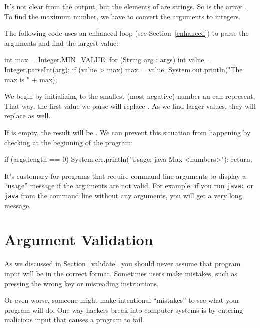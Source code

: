 \begin{stdout}
[10, -3, 55, 0, 14]
\end{stdout}

It's not clear from the output, but the elements of  are strings.
So  is the array .
To find the maximum number, we have to convert the arguments to integers.

The following code uses an enhanced  loop (see Section~\ref{enhanced}) to parse the arguments and find the largest value:

\begin{code}
int max = Integer.MIN_VALUE;
for (String arg : args) {
    int value = Integer.parseInt(arg);
    if (value > max) {
        max = value;
    }
}
System.out.println("The max is " + max);
\end{code}

We begin by initializing  to the smallest (most negative) number an  can represent.
That way, the first value we parse will replace .
As we find larger values, they will replace  as well.

If  is empty, the result will be .
We can prevent this situation from happening by checking  at the beginning of the program:

\begin{code}
if (args.length == 0) {
    System.err.println("Usage: java Max <numbers>");
    return;
}
\end{code}

It's customary for programs that require command-line arguments to display a ``usage'' message if the arguments are not valid.
For example, if you run {\tt javac} or {\tt java} from the command line without any arguments, you will get a very long message.


\section{Argument Validation}

As we discussed in Section~\ref{validate}, you should never assume that program input will be in the correct format.
Sometimes users make mistakes, such as pressing the wrong key or misreading instructions.


Or even worse, someone might make intentional ``mistakes'' to see what your program will do.
One way hackers break into computer systems is by entering malicious input that causes a program to fail.

